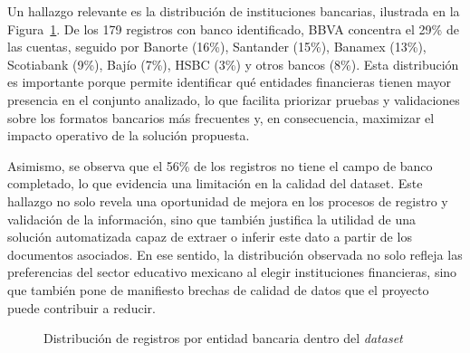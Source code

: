 Un hallazgo relevante es la distribución de instituciones bancarias, ilustrada en la Figura~\ref{fig:distribucion_bancos}. De los 179 registros con banco identificado, BBVA concentra el 29\% de las cuentas, seguido por Banorte (16\%), Santander (15\%), Banamex (13\%), Scotiabank (9\%), Bajío (7\%), HSBC (3\%) y otros bancos (8\%). Esta distribución es importante porque permite identificar qué entidades financieras tienen mayor presencia en el conjunto analizado, lo que facilita priorizar pruebas y validaciones sobre los formatos bancarios más frecuentes y, en consecuencia, maximizar el impacto operativo de la solución propuesta.


Asimismo, se observa que el 56\% de los registros no tiene el campo de banco completado, lo que evidencia una limitación en la calidad del dataset. Este hallazgo no solo revela una oportunidad de mejora en los procesos de registro y validación de la información, sino que también justifica la utilidad de una solución automatizada capaz de extraer o inferir este dato a partir de los documentos asociados. En ese sentido, la distribución observada no solo refleja las preferencias del sector educativo mexicano al elegir instituciones financieras, sino que también pone de manifiesto brechas de calidad de datos que el proyecto puede contribuir a reducir.

\begin{figure}[htbp]
\centering
{}
\caption{Distribución de registros por entidad bancaria dentro del \textit{dataset}}
\label{fig:distribucion_bancos}
\end{figure}

